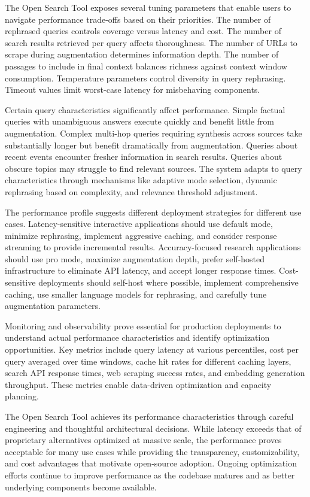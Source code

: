 The Open Search Tool exposes several tuning parameters that enable users to navigate performance trade-offs based on their priorities. The number of rephrased queries controls coverage versus latency and cost. The number of search results retrieved per query affects thoroughness. The number of URLs to scrape during augmentation determines information depth. The number of passages to include in final context balances richness against context window consumption. Temperature parameters control diversity in query rephrasing. Timeout values limit worst-case latency for misbehaving components.

Certain query characteristics significantly affect performance. Simple factual queries with unambiguous answers execute quickly and benefit little from augmentation. Complex multi-hop queries requiring synthesis across sources take substantially longer but benefit dramatically from augmentation. Queries about recent events encounter fresher information in search results. Queries about obscure topics may struggle to find relevant sources. The system adapts to query characteristics through mechanisms like adaptive mode selection, dynamic rephrasing based on complexity, and relevance threshold adjustment.

The performance profile suggests different deployment strategies for different use cases. Latency-sensitive interactive applications should use default mode, minimize rephrasing, implement aggressive caching, and consider response streaming to provide incremental results. Accuracy-focused research applications should use pro mode, maximize augmentation depth, prefer self-hosted infrastructure to eliminate API latency, and accept longer response times. Cost-sensitive deployments should self-host where possible, implement comprehensive caching, use smaller language models for rephrasing, and carefully tune augmentation parameters.

Monitoring and observability prove essential for production deployments to understand actual performance characteristics and identify optimization opportunities. Key metrics include query latency at various percentiles, cost per query averaged over time windows, cache hit rates for different caching layers, search API response times, web scraping success rates, and embedding generation throughput. These metrics enable data-driven optimization and capacity planning.

The Open Search Tool achieves its performance characteristics through careful engineering and thoughtful architectural decisions. While latency exceeds that of proprietary alternatives optimized at massive scale, the performance proves acceptable for many use cases while providing the transparency, customizability, and cost advantages that motivate open-source adoption. Ongoing optimization efforts continue to improve performance as the codebase matures and as better underlying components become available.

